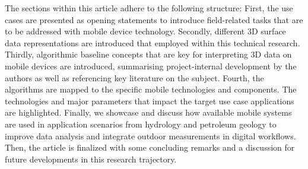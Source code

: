 \documentclass[review]{elsarticle}
\begin{document}

The sections within this article adhere to the following structure: First, the use cases are presented as opening statements to introduce field-related tasks that are to be addressed with mobile device technology. Secondly, different 3D surface data representations are introduced that employed within this technical research. Thirdly, algorithmic baseline concepts that are key for interpreting 3D data on mobile devices are introduced, summarising project-internal development by the authors as well as referencing key literature on the subject. Fourth, the algorithms are mapped to the specific mobile technologies and components. The technologies and major parameters that impact the target use case applications are highlighted. Finally, we showcase and discuss how available mobile systems are used in application scenarios from hydrology and petroleum geology to improve data analysis and integrate outdoor measurements in digital workflows. Then, the article is finalized with some concluding remarks and a discussion for future developments in this research trajectory.

\end{document}
